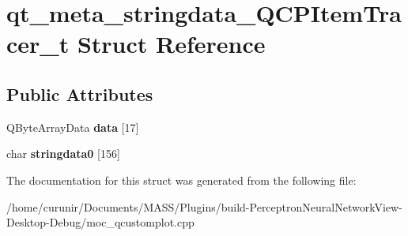 \hypertarget{structqt__meta__stringdata___q_c_p_item_tracer__t}{}\section{qt\+\_\+meta\+\_\+stringdata\+\_\+\+Q\+C\+P\+Item\+Tracer\+\_\+t Struct Reference}
\label{structqt__meta__stringdata___q_c_p_item_tracer__t}
\subsection*{Public Attributes}
\begin{DoxyCompactItemize}
\item 
Q\+Byte\+Array\+Data {\bfseries data} \mbox{[}17\mbox{]}\hypertarget{structqt__meta__stringdata___q_c_p_item_tracer__t_a22eae99e6c4a456148200505b43289b8}{}\label{structqt__meta__stringdata___q_c_p_item_tracer__t_a22eae99e6c4a456148200505b43289b8}

\item 
char {\bfseries stringdata0} \mbox{[}156\mbox{]}\hypertarget{structqt__meta__stringdata___q_c_p_item_tracer__t_a716a4a42fdc434d4a1e9e7b141e3715d}{}\label{structqt__meta__stringdata___q_c_p_item_tracer__t_a716a4a42fdc434d4a1e9e7b141e3715d}

\end{DoxyCompactItemize}


The documentation for this struct was generated from the following file\+:\begin{DoxyCompactItemize}
\item 
/home/curunir/\+Documents/\+M\+A\+S\+S/\+Plugins/build-\/\+Perceptron\+Neural\+Network\+View-\/\+Desktop-\/\+Debug/moc\+\_\+qcustomplot.\+cpp\end{DoxyCompactItemize}
